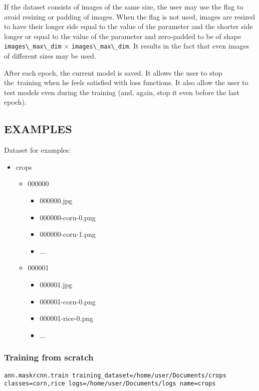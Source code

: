 If the dataset consists of images of the same size, the user may use the
 flag to avoid resizing or padding of images. When the
flag is not used, images are resized to have their longer side equal to the
value of the  parameter and the shorter
side longer or equal to the value of the 
parameter and zero-padded to be of shape \verb|images\_max\_dim| $\times$
\verb|images\_max\_dim|. It results in the fact that even images of different
sizes may be used. 

After each epoch, the current model is saved. It allows the user to stop the~training
when he feels satisfied with loss functions. It also allow the user to
test models even during the training (and, again, stop it even before the last
epoch). 

\subsection*{EXAMPLES}
Dataset for examples: 

\liststyleLii
\begin{itemize}
\item crops 

\begin{itemize}
\item 000000 

\begin{itemize}
\item 000000.jpg 
\item 000000-corn-0.png 
\item 000000-corn-1.png 
\item ... 
\end{itemize}
\item 000001 

\begin{itemize}
\item 000001.jpg 
\item 000001-corn-0.png 
\item 000001-rice-0.png 
\item ... 
\end{itemize}
\end{itemize}
\end{itemize}

\subsubsection*{Training from scratch}
\begin{lstlisting}[breaklines=true]
ann.maskrcnn.train training_dataset=/home/user/Documents/crops classes=corn,rice logs=/home/user/Documents/logs name=crops
\end{lstlisting}

